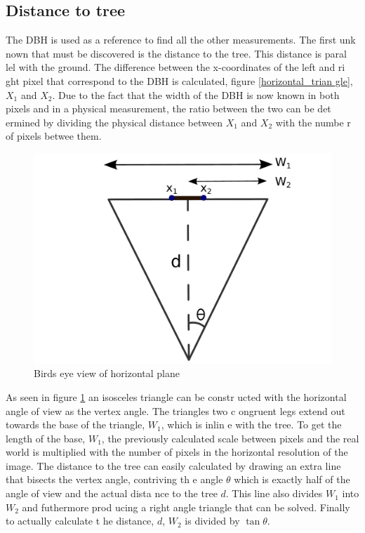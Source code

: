 \subsection{Distance to tree}
The DBH is used as a reference to find all the other measurements. The first unk
nown that must be discovered is the distance to the tree. This distance is paral
lel with the ground. The difference between the x-coordinates of the left and ri
ght pixel that correspond to the DBH is calculated, figure \ref{horizontal_trian
gle}, $X_1$ and $X_2$. Due to the fact that the width of the DBH is now known in
 both pixels and in a physical measurement, the ratio between the two can be det
ermined by dividing the physical distance between $X_1$ and $X_2$ with the numbe
r of pixels betwee them.
\begin{figure}[htp]
\centering
{
	\includegraphics[scale=0.3]{horizontal_triangle.pdf}
	\caption{Birds eye view of horizontal plane}
	\label{horizontal_triangle}
}
\end{figure}
 As seen in figure \ref{horizontal_triangle} an isosceles triangle can be constr
ucted with the horizontal angle of view as the vertex angle. The triangles two c
ongruent legs extend out towards the base of the triangle, $W_1$, which is inlin
e with the tree. To get the length of the base, %
$W_1$, the previously calculated
 scale between pixels and the real world is multiplied with the number of pixels
 in the horizontal resolution of the image. The distance to the tree can easily 
calculated by drawing an extra line that bisects the vertex angle, contriving th %
e angle $\theta$ which is exactly half of the angle of view and the actual dista
nce to the tree $d$. This line also divides $W_1$ into $W_2$ and futhermore prod %
ucing a right angle triangle that can be solved. Finally to actually calculate t
he distance, $d$, $W_2$ is divided by $\tan{\theta}$.


